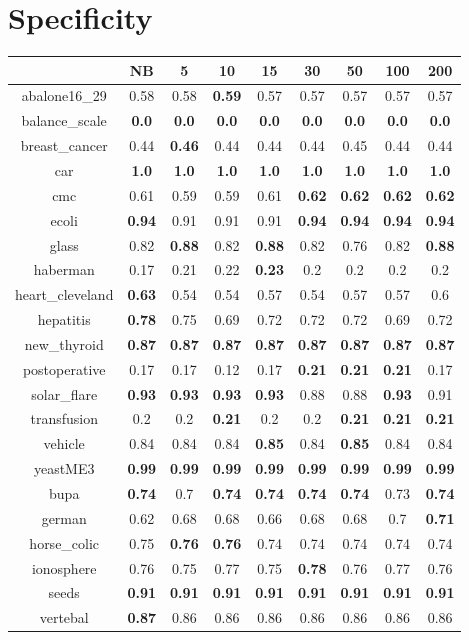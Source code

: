 \documentclass{article}%
\begin{document}
%
\section*{Specificity}%
\begin{tabular}{c|cccccccc}%
\hline%
&NB&5&10&15&30&50&100&200\\%
\hline%
abalone16\_29&0.58&0.58&\textbf{0.59}&0.57&0.57&0.57&0.57&0.57\\%
\hline%
balance\_scale&\textbf{0.0}&\textbf{0.0}&\textbf{0.0}&\textbf{0.0}&\textbf{0.0}&\textbf{0.0}&\textbf{0.0}&\textbf{0.0}\\%
\hline%
breast\_cancer&0.44&\textbf{0.46}&0.44&0.44&0.44&0.45&0.44&0.44\\%
\hline%
car&\textbf{1.0}&\textbf{1.0}&\textbf{1.0}&\textbf{1.0}&\textbf{1.0}&\textbf{1.0}&\textbf{1.0}&\textbf{1.0}\\%
\hline%
cmc&0.61&0.59&0.59&0.61&\textbf{0.62}&\textbf{0.62}&\textbf{0.62}&\textbf{0.62}\\%
\hline%
ecoli&\textbf{0.94}&0.91&0.91&0.91&\textbf{0.94}&\textbf{0.94}&\textbf{0.94}&\textbf{0.94}\\%
\hline%
glass&0.82&\textbf{0.88}&0.82&\textbf{0.88}&0.82&0.76&0.82&\textbf{0.88}\\%
\hline%
haberman&0.17&0.21&0.22&\textbf{0.23}&0.2&0.2&0.2&0.2\\%
\hline%
heart\_cleveland&\textbf{0.63}&0.54&0.54&0.57&0.54&0.57&0.57&0.6\\%
\hline%
hepatitis&\textbf{0.78}&0.75&0.69&0.72&0.72&0.72&0.69&0.72\\%
\hline%
new\_thyroid&\textbf{0.87}&\textbf{0.87}&\textbf{0.87}&\textbf{0.87}&\textbf{0.87}&\textbf{0.87}&\textbf{0.87}&\textbf{0.87}\\%
\hline%
postoperative&0.17&0.17&0.12&0.17&\textbf{0.21}&\textbf{0.21}&\textbf{0.21}&0.17\\%
\hline%
solar\_flare&\textbf{0.93}&\textbf{0.93}&\textbf{0.93}&\textbf{0.93}&0.88&0.88&\textbf{0.93}&0.91\\%
\hline%
transfusion&0.2&0.2&\textbf{0.21}&0.2&0.2&\textbf{0.21}&\textbf{0.21}&\textbf{0.21}\\%
\hline%
vehicle&0.84&0.84&0.84&\textbf{0.85}&0.84&\textbf{0.85}&0.84&0.84\\%
\hline%
yeastME3&\textbf{0.99}&\textbf{0.99}&\textbf{0.99}&\textbf{0.99}&\textbf{0.99}&\textbf{0.99}&\textbf{0.99}&\textbf{0.99}\\%
\hline%
bupa&\textbf{0.74}&0.7&\textbf{0.74}&\textbf{0.74}&\textbf{0.74}&\textbf{0.74}&0.73&\textbf{0.74}\\%
\hline%
german&0.62&0.68&0.68&0.66&0.68&0.68&0.7&\textbf{0.71}\\%
\hline%
horse\_colic&0.75&\textbf{0.76}&\textbf{0.76}&0.74&0.74&0.74&0.74&0.74\\%
\hline%
ionosphere&0.76&0.75&0.77&0.75&\textbf{0.78}&0.76&0.77&0.76\\%
\hline%
seeds&\textbf{0.91}&\textbf{0.91}&\textbf{0.91}&\textbf{0.91}&\textbf{0.91}&\textbf{0.91}&\textbf{0.91}&\textbf{0.91}\\%
\hline%
vertebal&\textbf{0.87}&0.86&0.86&0.86&0.86&0.86&0.86&0.86\\%
\hline%
\end{tabular}
\end{document}
